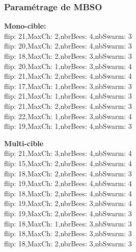 \subsubsection{Paramétrage de MBSO}
\noindent
\begin{minipage}[t]{0.55\textwidth}
	\textbf{Mono-cible:} \\
	flip: 21,MaxCh: 2,nbrBees: 4,nbSwarm: 3\\
	flip: 20,MaxCh: 2,nbrBees: 4,nbSwarm: 3\\
	flip: 18,MaxCh: 2,nbrBees: 3,nbSwarm: 3\\
	flip: 20,MaxCh: 1,nbrBees: 3,nbSwarm: 4\\
	flip: 21,MaxCh: 2,nbrBees: 4,nbSwarm: 4\\
	flip: 17,MaxCh: 1,nbrBees: 3,nbSwarm: 3\\
	flip: 21,MaxCh: 1,nbrBees: 4,nbSwarm: 3\\
	flip: 21,MaxCh: 2,nbrBees: 4,nbSwarm: 3\\
	flip: 22,MaxCh: 1,nbrBees: 3,nbSwarm: 4\\
	flip: 19,MaxCh: 1,nbrBees: 4,nbSwarm: 3\\
\end{minipage}\hfill
\hspace{0.2cm}
\begin{minipage}[t]{0.55\textwidth}
	\textbf{Multi-cible}\\
	flip: 21,MaxCh: 3,nbrBees: 4,nbSwarm: 4\\
	flip: 15,MaxCh: 2,nbrBees: 4,nbSwarm: 4\\
	flip: 18,MaxCh: 2,nbrBees: 4,nbSwarm: 3\\
	flip: 19,MaxCh: 2,nbrBees: 4,nbSwarm: 4\\
	flip: 18,MaxCh: 2,nbrBees: 4,nbSwarm: 4\\
	flip: 19,MaxCh: 2,nbrBees: 3,nbSwarm: 4\\
	flip: 19,MaxCh: 2,nbrBees: 4,nbSwarm: 3\\
	flip: 18,MaxCh: 1,nbrBees: 3,nbSwarm: 3\\
	flip: 18,MaxCh: 2,nbrBees: 3,nbSwarm: 3\\
	flip: 18,MaxCh: 2,nbrBees: 3,nbSwarm: 3\\
\end{minipage}\hfill




